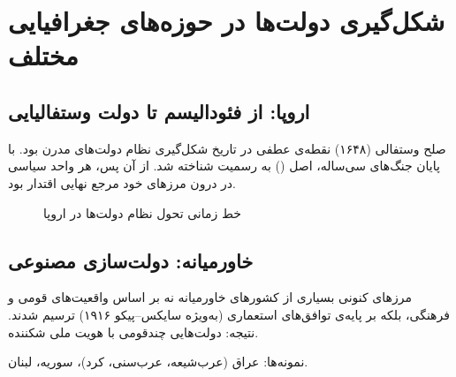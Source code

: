 \section{شکل‌گیری دولت‌ها در حوزه‌های جغرافیایی مختلف}

\subsection{اروپا: از فئودالیسم تا دولت وستفالیایی}

صلح وستفالی (۱۶۴۸) نقطه‌ی عطفی در تاریخ شکل‌گیری نظام دولت‌های مدرن بود. با پایان جنگ‌های سی‌ساله، اصل  () به رسمیت شناخته شد. از آن پس، هر واحد سیاسی در درون مرزهای خود مرجع نهایی اقتدار بود.

\begin{figure}[htbp]
\centering
{}
\caption{خط زمانی تحول نظام دولت‌ها در اروپا}
\label{fig:europe-timeline}
\end{figure}

\subsection{خاورمیانه: دولت‌سازی مصنوعی}

\begin{challengebox}
مرزهای کنونی بسیاری از کشورهای خاورمیانه نه بر اساس واقعیت‌های قومی و فرهنگی، بلکه بر پایه‌ی توافق‌های استعماری (به‌ویژه سایکس–پیکو ۱۹۱۶) ترسیم شدند. نتیجه: دولت‌هایی چندقومی با هویت ملی شکننده.

نمونه‌ها: عراق (عرب‌شیعه، عرب‌سنی، کرد)، سوریه، لبنان.
\end{challengebox}

